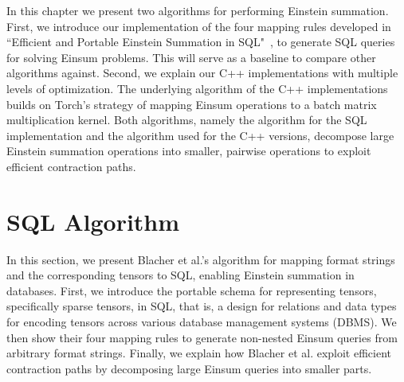 In this chapter we present two algorithms for performing Einstein summation. First,
we introduce our implementation of the four mapping rules developed in ``Efficient and Portable
Einstein Summation in SQL"~\cite{sql_einsum}, to generate SQL queries for solving Einsum problems.
This will serve as a baseline to compare other algorithms against. Second, we explain our C++
implementations with multiple levels of optimization. The underlying algorithm of the C++ 
implementations builds on Torch's strategy of mapping Einsum operations to a batch matrix 
multiplication kernel. Both algorithms, namely the algorithm for the SQL implementation and 
the algorithm used for the C++ versions, decompose large Einstein summation operations
into smaller, pairwise operations to exploit efficient contraction paths.

\section{SQL Algorithm}
In this section, we present Blacher et al.'s algorithm for mapping format strings and the 
corresponding tensors to SQL, enabling Einstein summation in databases. First, we introduce
the portable schema for representing tensors, specifically sparse tensors, in SQL, that is, 
a design for relations and data types for encoding tensors across various database management
systems (DBMS). We then show their four mapping rules to generate non-nested Einsum queries
from arbitrary format strings. Finally, we explain how Blacher et al. exploit efficient 
contraction paths by decomposing large Einsum queries into smaller parts.